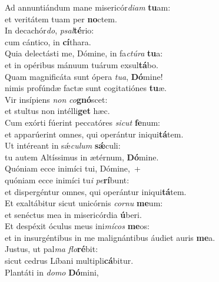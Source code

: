 \evenverse Ad annuntiándum mane misericór\textit{di}\textit{am} \textbf{tu}am:~\*\\
\evenverse et veritátem tuam per \textbf{no}ctem.\\
\oddverse In decachór\textit{do}, \textit{psal}\textbf{té}rio:~\*\\
\oddverse cum cántico, in \textbf{cí}thara.\\
\evenverse Quia delectásti me, Dómine, in fa\textit{ctú}\textit{ra} \textbf{tu}a:~\*\\
\evenverse et in opéribus mánuum tuárum exsul\textbf{tá}bo.\\
\oddverse Quam magnificáta sunt ópera \textit{tu}\textit{a}, \textbf{Dó}mine!~\*\\
\oddverse nimis profúndæ factæ sunt cogitatiónes \textbf{tu}æ.\\
\evenverse Vir insípiens \textit{non} \textit{co}\textbf{gnó}scet:~\*\\
\evenverse et stultus non intélli\textbf{get} hæc.\\
\oddverse Cum exórti fúerint peccatóres \textit{si}\textit{cut} \textbf{fe}num:~\*\\
\oddverse et apparúerint omnes, qui operántur iniqui\textbf{tá}tem.\\
\evenverse Ut intéreant in sǽ\textit{cu}\textit{lum} \textbf{sǽ}culi:~\*\\
\evenverse tu autem Altíssimus in ætérnum, \textbf{Dó}mine.\\
\oddverse Quóniam ecce inimíci tui, Dómine,~+\\
\oddverse  quóniam ecce inimíci tu\textit{i} \textit{pe}\textbf{rí}bunt:~\*\\
\oddverse et dispergéntur omnes, qui operántur iniqui\textbf{tá}tem.\\
\evenverse Et exaltábitur sicut unicórnis \textit{cor}\textit{nu} \textbf{me}um:~\*\\
\evenverse et senéctus mea in misericórdia \textbf{ú}beri.\\
\oddverse Et despéxit óculus meus ini\textit{mí}\textit{cos} \textbf{me}os:~\*\\
\oddverse et in insurgéntibus in me malignántibus áudiet auris \textbf{me}a.\\
\evenverse Justus, ut pal\textit{ma} \textit{flo}\textbf{ré}bit:~\*\\
\evenverse sicut cedrus Líbani multipli\textbf{cá}bitur.\\
\oddverse Plantáti in \textit{do}\textit{mo} \textbf{Dó}mini,~\*\\
